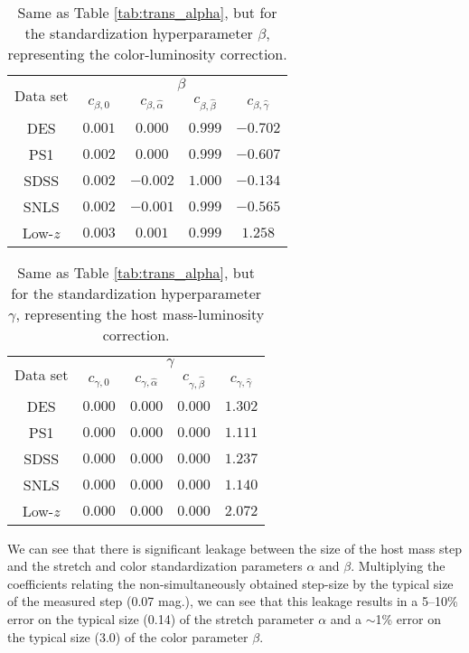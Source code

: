 \begin{table}[htbp]
    \centering
    \begin{tabular}{ccccc}\toprule
        \multirow{2}{*}{Data set} &
        \multicolumn{4}{c}{$\beta$}\\
        {} &  $c_{\beta, 0}$ &  $c_{\beta,\hat{\alpha}}$ & $c_{\beta,\hat{\beta}}$ & $c_{\beta,\hat{\gamma}}$\\\midrule
        DES & $0.001$ & $0.000$ & $0.999$ & $-0.702$\\
        PS1 & $0.002$ & $0.000$ & $0.999$ & $-0.607$\\
        SDSS & $0.002$ & $-0.002$ & $1.000$ & $-0.134$\\
        SNLS & $0.002$ & $-0.001$ & $0.999$ & $-0.565$\\
        Low-$z$ & $0.003$ & $0.001$ & $0.999$ & $1.258$\\
    \bottomrule
    \end{tabular}
    \caption{Same as Table \ref{tab:trans_alpha}, but for the standardization hyperparameter $\beta$, representing the color-luminosity correction.}
    \label{tab:trans_beta}
\end{table}

\begin{table}[htbp]
    \centering
    \begin{tabular}{ccccc}\toprule
        \multirow{2}{*}{Data set} &
        \multicolumn{4}{c}{$\gamma$}\\
        {} &  $c_{\gamma, 0}$ &  $c_{\gamma,\hat{\alpha}}$ & $c_{\gamma,\hat{\beta}}$ & $c_{\gamma,\hat{\gamma}}$ \\\midrule
        DES & $0.000$ & $0.000$ & $0.000$ & $1.302$\\
        PS1 & $0.000$ & $0.000$ & $0.000$ & $1.111$\\
        SDSS & $0.000$ & $0.000$ & $0.000$ & $1.237$\\
        SNLS & $0.000$ & $0.000$ & $0.000$ & $1.140$\\
        Low-$z$ & $0.000$ & $0.000$ & $0.000$ & $2.072$\\
    \bottomrule
    \end{tabular}
    \caption{Same as Table \ref{tab:trans_alpha}, but for the standardization hyperparameter $\gamma$, representing the host mass-luminosity correction.}
    \label{tab:trans_gamma}
\end{table}

We can see that there is significant leakage between the size of the host mass step and the stretch and color standardization parameters $\alpha$ and $\beta$. Multiplying the coefficients relating the non-simultaneously obtained step-size by the typical size of the measured step (0.07 mag.), we can see that this leakage results in a 5--10\% error on the typical size (0.14) of the stretch parameter $\alpha$ and a $\sim$1\% error on the typical size (3.0) of the color parameter $\beta$.

